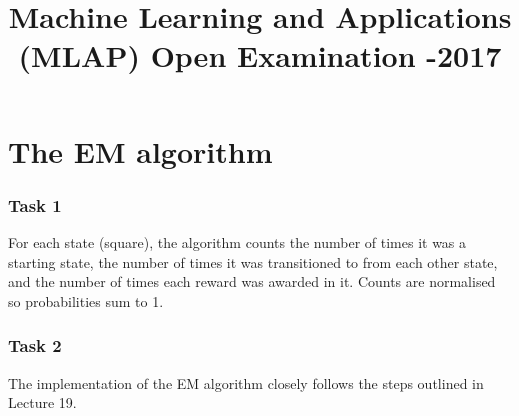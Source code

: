 \documentclass[a4paper, 11pt]{article}
\begin{document}
\title{\textbf {
Machine Learning and Applications (MLAP)
Open Examination -2017}}
\date{}
\maketitle


\part*{The EM algorithm}
\section{Task 1}
For each state (square), the algorithm counts the number of times it was a starting state, the number of times it was transitioned to from each other state, and the number of times each reward was awarded in it. Counts are normalised so probabilities sum to 1.    

\section{Task 2}
The implementation of the EM algorithm closely follows the steps outlined in Lecture 19. 
\end{document}

